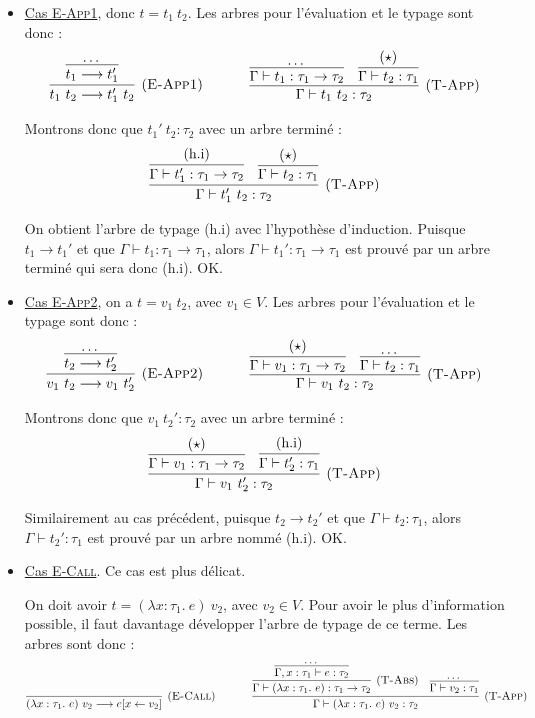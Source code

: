 \documentclass[11pt]{article}
\begin{document}
\begin{itemize}
    \item \underline{Cas {\scshape{E-App1}}}, donc $t=t_1~t_2$. Les arbres pour l'évaluation et le typage sont donc :
    $$
    \infer[(\text{\scshape{E-App1}})]{t_1~t_2\longrightarrow t_1'~t_2}{
        \infer{t_1\longrightarrow t_1'}{\dots}
    }
    ~~~~~~~~~~
    \infer[(\text{\scshape{T-App}})]
    {\Gamma\vdash t_1~t_2:\tau_2}
    {
        \infer{\Gamma\vdash t_1:\tau_1\to\tau_2}{\dots}
        &
        \infer{\Gamma\vdash t_2:\tau_1}{(\star)}
    }
    $$

    Montrons donc que $t_1'~t_2:\tau_2$ avec un arbre terminé :
    $$
    \infer[(\text{\scshape{T-App}})]
    {\Gamma\vdash t_1'~t_2:\tau_2}
    {
        \infer{\Gamma\vdash t_1':\tau_1\to\tau_2}{(\text{h.i})}
        &
        \infer{\Gamma\vdash t_2:\tau_1}{(\star)}
    }
    $$

    On obtient l'arbre de typage (h.i) avec l'hypothèse d'induction. Puisque $t_1\longrightarrow t_1'$ et que $\Gamma\vdash t_1:\tau_1\to\tau_1$, alors $\Gamma\vdash t_1':\tau_1\to\tau_1$ est prouvé par un arbre terminé qui sera donc (h.i). OK.
    
    \item \underline{Cas {\scshape{E-App2}}}, on a $t=v_1~t_2$, avec $v_1\in V$. Les arbres pour l'évaluation et le typage sont donc :
    $$
    \infer[(\text{\scshape{E-App2}})]{v_1~t_2\longrightarrow v_1~t_2'}{
        \infer{t_2 \longrightarrow t_2'}{\dots}
    }
    ~~~~~~~~~~
    \infer[(\text{\scshape{T-App}})]
    {\Gamma\vdash v_1~t_2:\tau_2}
    {
        \infer{\Gamma\vdash v_1:\tau_1\to\tau_2}{(\star)}
        &
        \infer{\Gamma\vdash t_2:\tau_1}{\dots}
    }
    $$

    Montrons donc que $v_1~t_2':\tau_2$ avec un arbre terminé :
    $$
    \infer[(\text{\scshape{T-App}})]
    {\Gamma\vdash v_1~t_2':\tau_2}
    {
        \infer{\Gamma\vdash v_1:\tau_1\to\tau_2}{(\star)}
        &
        \infer{\Gamma\vdash t_2':\tau_1}{(\text{h.i})}
    }
    $$

    Similairement au cas précédent, puisque $t_2\longrightarrow t_2'$ et que $\Gamma\vdash t_2:\tau_1$, alors $\Gamma\vdash t_2':\tau_1$ est prouvé par un arbre nommé (h.i). OK.

    \item \underline{Cas {\scshape{E-Call}}}. Ce cas est plus délicat.
    
    On doit avoir $t=(\lambda x:\tau_1.~e)~v_2$, avec $v_2\in V$. Pour avoir le plus d'information possible, il faut davantage développer l'arbre de typage de ce terme. Les arbres sont donc :
    $$
    \infer[(\text{\scshape{E-Call}})]{(\lambda x:\tau_1.~e)~v_2\longrightarrow e[x\leftarrow v_2]}{}
    ~~~~~~~~~~
    \infer[(\text{\scshape{T-App}})]
    {\Gamma\vdash (\lambda x:\tau_1.~e)~v_2:\tau_2}
    {
        \infer[(\text{\scshape{T-Abs}})]
        {\Gamma\vdash (\lambda x:\tau_1.~e):\tau_1\to\tau_2}{
            \infer{\Gamma, x:\tau_1\vdash e:\tau_2}{\dots}
        }
        &
        \infer{\Gamma\vdash v_2:\tau_1}{\dots}
    }
    $$


\end{itemize}
\end{document}
